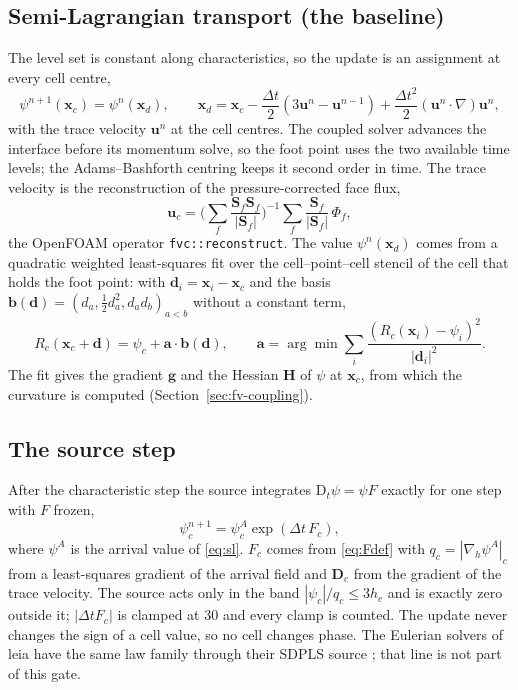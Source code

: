 \documentclass[preprint,3p,11pt]{elsarticle}
\newcommand{\psilev}{\psi}
\newcommand{\bu}{\mathbf{u}}
\newcommand{\bx}{\mathbf{x}}
\newcommand{\Dt}{\mathrm{D}_t}
\begin{document}
\subsection{Semi-Lagrangian transport (the baseline)}
\label{sec:fv-sl}
The level set is constant along characteristics, so the update is an assignment at
every cell centre,
\begin{equation}
  \psilev^{n+1}(\bx_c)=\psilev^n(\bx_d),\qquad
  \bx_d=\bx_c-\frac{\Delta t}{2}\left(3\bu^n-\bu^{n-1}\right)
        +\frac{\Delta t^2}{2}\left(\bu^n\cdot\nabla\right)\bu^n,
  \label{eq:sl}
\end{equation}
with the trace velocity $\bu^n$ at the cell centres. The coupled solver advances the
interface before its momentum solve, so the foot point uses the two available time
levels; the Adams--Bashforth centring keeps it second order in time. The trace velocity
is the reconstruction of the pressure-corrected face flux,
\begin{equation}
  \bu_c=\Big(\sum_f\frac{\mathbf S_f\mathbf S_f}{|\mathbf S_f|}\Big)^{-1}
        \sum_f\frac{\mathbf S_f}{|\mathbf S_f|}\,\Phi_f,
  \label{eq:reconstruct}
\end{equation}
the OpenFOAM operator \texttt{fvc::reconstruct}. The value $\psilev^n(\bx_d)$ comes from
a quadratic weighted least-squares fit over the cell--point--cell stencil of the cell
that holds the foot point: with $\mathbf d_i=\bx_i-\bx_c$ and the basis
$\mathbf b(\mathbf d)=(d_a,\tfrac12d_a^2,d_ad_b)_{a<b}$ without a constant term,
\begin{equation}
  R_c(\bx_c+\mathbf d)=\psilev_c+\mathbf a\cdot\mathbf b(\mathbf d),\qquad
  \mathbf a=\arg\min\sum_{i}\frac{\left(R_c(\bx_i)-\psilev_i\right)^2}{|\mathbf d_i|^2}.
  \label{eq:fit}
\end{equation}
The fit gives the gradient $\mathbf g$ and the Hessian $\mathbf H$ of $\psilev$ at
$\bx_c$, from which the curvature is computed (Section~\ref{sec:fv-coupling}).

\subsection{The source step}
\label{sec:fv-source}
After the characteristic step the source integrates $\Dt\psilev=\psilev F$ exactly for
one step with $F$ frozen,
\begin{equation}
  \psilev_c^{n+1}=\psilev_c^{A}\exp\!\left(\Delta t\,F_c\right),
  \label{eq:expUpdate}
\end{equation}
where $\psilev^A$ is the arrival value of \eqref{eq:sl}. $F_c$ comes from
\eqref{eq:Fdef} with $q_c=|\nabla_h\psilev^A|_c$ from a least-squares gradient of the
arrival field and $\mathbf D_c$ from the gradient of the trace velocity. The source acts
only in the band $|\psilev_c|/q_c\le3h_c$ and is exactly zero outside it; $|\Delta
tF_c|$ is clamped at $30$ and every clamp is counted. The update never changes the sign
of a cell value, so no cell changes phase. The Eulerian solvers of leia have the same
law family through their SDPLS source \cite{FrickeEtAl2022}; that line is not part of
this gate.
\end{document}
